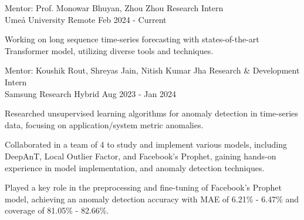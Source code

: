 

\begin{cventries}

\cventry
    {Mentor: Prof. Monowar Bhuyan, Zhou Zhou} %
    {Research Intern\\ \MYhref{} {Umeå University}} %
    {Remote} %
    {Feb 2024 - Current} %
    {
      \begin{cvitems} %
        \item {Working on long sequence time-series forecasting with states-of-the-art Transformer model, utilizing diverse tools and techniques.}
      \end{cvitems}
    }

\cventry
    {Mentor: Koushik Rout, Shreyas Jain, Nitish Kumar Jha} %
    {Research \& Development Intern\\  {Samsung Research}} %
    {Hybrid} %
    {Aug 2023 - Jan 2024} %
    {
      \begin{cvitems} %
        \item {Researched unsupervised learning algorithms for anomaly detection in time-series data,  focusing on application/system metric anomalies.}
        \item {Collaborated in a team of 4 to study and implement various models, including DeepAnT, Local Outlier Factor, and Facebook's Prophet, gaining hands-on experience in model implementation, and anomaly detection techniques.}
        \item {Played a key role in the preprocessing and fine-tuning of Facebook's Prophet model, achieving an anomaly detection accuracy with MAE of 6.21\% - 6.47\% and coverage of 81.05\% - 82.66\%.}
      \end{cvitems}
    }


\end{cventries}
